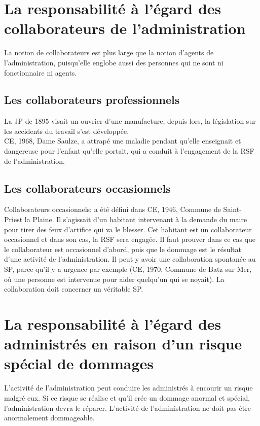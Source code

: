 \documentclass[10pt, a4paper, openany]{book}
\begin{document}
\section{La responsabilité à l'égard des collaborateurs de l'administration}

La notion de collaborateurs est plus large que la notion d'agents de l'administration, puisqu'elle englobe aussi des personnes qui ne sont ni fonctionnaire ni agents.

\subsection{Les collaborateurs professionnels}

La JP de 1895 visait un ouvrier d'une manufacture, depuis lors, la législation sur les accidents du travail s'est développée. \\
CE, 1968, Dame Saulze, a attrapé une maladie pendant qu'elle enseignait et dangereuse pour l'enfant qu'elle portait, qui a conduit à l'engagement de la RSF de l'administration. \\

\subsection{Les collaborateurs occasionnels}

Collaborateurs occasionnels: a été défini dans CE, 1946, Commune de Saint-Priest la Plaine. Il s'agissait d'un habitant intervenant à la demande du maire pour tirer des feux d'artifice qui va le blesser. Cet habitant est un collaborateur occasionnel et dans son cas, la RSF sera engagée. Il faut prouver dans ce cas que le collaborateur est occasionnel d'abord, puis que le dommage est le résultat d'une activité de l'administration. Il peut y avoir une collaboration spontanée au SP, parce qu'il y a urgence par exemple (CE, 1970, Commune de Batz sur Mer, où une personne est intervenue pour aider quelqu'un qui se noyait). La collaboration doit concerner un véritable SP. 

\section{La responsabilité à l'égard des administrés en raison d'un risque spécial de dommages}

L'activité de l'administration peut conduire les administrés à encourir un risque malgré eux. Si ce risque se réalise et qu'il crée un dommage anormal et spécial, l'administration devra le réparer. L'activité de l'administration ne doit pas être anormalement dommageable. 
\end{document}
